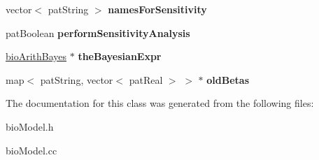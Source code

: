 \begin{DoxyCompactItemize}
\item 
\mbox{\label{classbio_model_a1da08b67b1c536aba1330cd11e4f0298}} 
vector$<$ pat\+String $>$ {\bfseries names\+For\+Sensitivity}
\item 
\mbox{\label{classbio_model_a4bb24b44f8b9c0b10cf42b2d7c56fd6e}} 
pat\+Boolean {\bfseries perform\+Sensitivity\+Analysis}
\item 
\mbox{\label{classbio_model_a1a5b3d87d39762225b02d4cfdae2cdf2}} 
\hyperlink{classbio_arith_bayes}{bio\+Arith\+Bayes} $\ast$ {\bfseries the\+Bayesian\+Expr}
\item 
\mbox{\label{classbio_model_a7322634a86afae82cf09fe5d5bdfc42c}} 
map$<$ pat\+String, vector$<$ pat\+Real $>$ $>$ $\ast$ {\bfseries old\+Betas}
\end{DoxyCompactItemize}


The documentation for this class was generated from the following files\+:\begin{DoxyCompactItemize}
\item 
bio\+Model.\+h\item 
bio\+Model.\+cc\end{DoxyCompactItemize}
